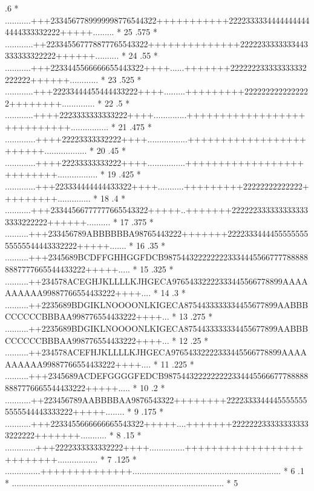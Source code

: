 \begin{Listing}
      .6    *       ...........+++2334567789999998776544322+++++++++++22223333344444444444444333332222+++++.........   *  25
      .575  *       ............++223345567778877765543322++++++++++++++2222233333333443333333322222++++++..........   *  24
      .55   *        ...........+++2233445566666655443322++++......+++++++222222233333333332222222++++++............   *  23
      .525  *        ............+++22233444455444433222++++.........+++++++++2222222222222222++++++++..............   *  22
      .5    *         ............++++2223333333333222++++..............++++++++++++++++++++++++++++................   *  21
      .475  *         .............++++22223333332222++++.................++++++++++++++++++++++++..................   *  20
      .45   *         .............++++22233333333222++++................++++++++++++++++++++++++++.................   *  19
      .425  *        .............+++223334444444433322++++...........+++++++++22222222222222+++++++++..............   *  18
      .4    *        ...........+++23344566777777665543322+++++..+++++++2222223333333333333333222222++++++..........   *  17
      .375  *       ..........+++233456789ABBBBBBA98765443222+++++++222233344445555555555555544443332222+++++.......   *  16
      .35   *      ..........+++2345689BCDFFGHHGGFDCB98754432222222233344455667777888888887777665544433222+++++.....   *  15
      .325  *      ..........++234578ACEGHJKLLLLKJHGECA97654332222333445566778899AAAAAAAAAA99887766554433222++++....   *  14
      .3    *     ..........++2235689BDGIKLNOOOONLKIGECA8754433333334455677899AABBBCCCCCCBBBAA998776554433222++++...   *  13
      .275  *     ..........++2235689BDGIKLNOOOONLKIGECA8754433333334455677899AABBBCCCCCCBBBAA998776554433222++++...   *  12
      .25   *      ..........++234578ACEFHJKLLLLKJHGECA97654332222333445566778899AAAAAAAAAA99887766554433222++++....   *  11
      .225  *      ..........+++2345689ACDEFGGGGFEDCB98754432222222223344455666777888888887776665544433222+++++.....   *  10
      .2    *       ...........++223456789AABBBBAA9876543322++++++++22223333444455555555555544443333222+++++........   *   9
      .175  *        ...........+++2233455666666665543322+++++....+++++++2222222333333333333222222+++++++...........   *   8
      .15   *         .............+++2222333333332222++++...............++++++++++++++++++++++++++.................   *   7
      .125  *           ...............++++++++++++++...............................................................   *   6
      .1    *             ..........................................................................................   *   5

\end{Listing}
